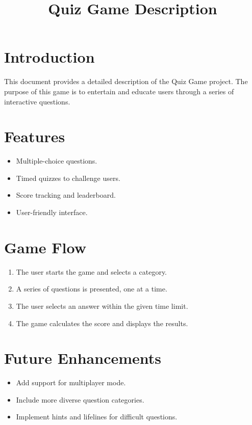 \documentclass[a4paper,12pt]{article}
\title{Quiz Game Description}
\author{}
\date{}
\begin{document}
\maketitle

\section*{Introduction}
This document provides a detailed description of the Quiz Game project. The purpose of this game is to entertain and educate users through a series of interactive questions.

\section*{Features}
\begin{itemize}
    \item Multiple-choice questions.
    \item Timed quizzes to challenge users.
    \item Score tracking and leaderboard.
    \item User-friendly interface.
\end{itemize}

\section*{Game Flow}
\begin{enumerate}
    \item The user starts the game and selects a category.
    \item A series of questions is presented, one at a time.
    \item The user selects an answer within the given time limit.
    \item The game calculates the score and displays the results.
\end{enumerate}

\section*{Future Enhancements}
\begin{itemize}
    \item Add support for multiplayer mode.
    \item Include more diverse question categories.
    \item Implement hints and lifelines for difficult questions.
\end{itemize}
\end{document}
